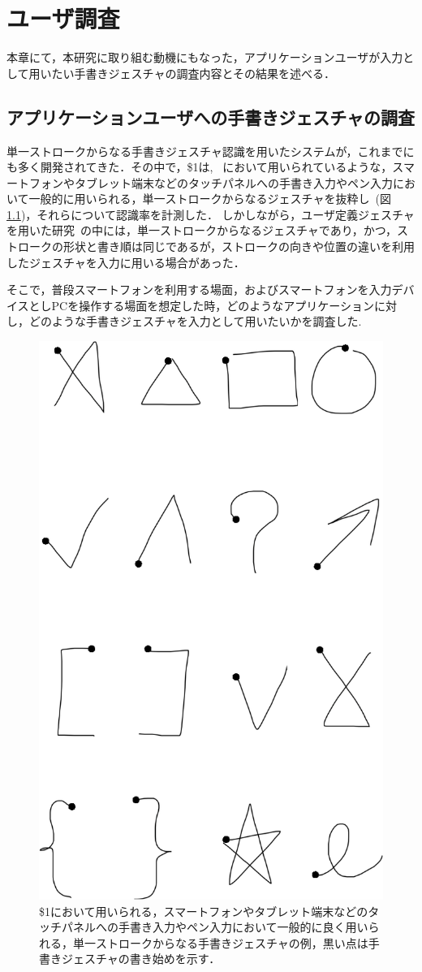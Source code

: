 \chapter{ユーザ調査}
本章にて，本研究に取り組む動機にもなった，アプリケーションユーザが入力として用いたい手書きジェスチャの調査内容とその結果を述べる．

\section{アプリケーションユーザへの手書きジェスチャの調査}
単一ストロークからなる手書きジェスチャ認識を用いたシステムが，これまでにも多く開発されてきた．その中で，\$1は,  ~\cite{Hong:2000:STI:354401.354412, Landay:1993:EEU:259964.260123, Lin:2000:DFT:332040.332486}において用いられているような，スマートフォンやタブレット端末などのタッチパネルへの手書き入力やペン入力において一般的に用いられる，単一ストロークからなるジェスチャを抜粋し~(図\ref{fig:stroke_1})，それらについて認識率を計測した．
しかしながら，ユーザ定義ジェスチャを用いた研究~\cite{Vatavu:2012:UGF:2325616.2325626, Bragdon:2011:EAT:1978942.1979000, Wobbrock:2009:UGS:1518701.1518866, Shimon:2015:EUB:2785830.2785890}の中には，単一ストロークからなるジェスチャであり，かつ，ストロークの形状と書き順は同じであるが，ストロークの向きや位置の違いを利用したジェスチャを入力に用いる場合があった．

そこで，普段スマートフォンを利用する場面，およびスマートフォンを入力デバイスとしPCを操作する場面を想定した時，どのようなアプリケーションに対し，どのような手書きジェスチャを入力として用いたいかを調査した.

\begin{figure}[!h]
\centering
\includegraphics[width=0.25\columnwidth]{img/stroke_1.eps}
\caption{\$1において用いられる，スマートフォンやタブレット端末などのタッチパネルへの手書き入力やペン入力において一般的に良く用いられる，単一ストロークからなる手書きジェスチャの例，黒い点は手書きジェスチャの書き始めを示す．}
\label{fig:stroke_1}
\end{figure}

